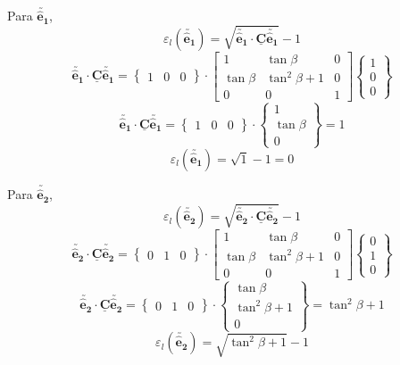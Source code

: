 \begin{enumerate}
		Para $\utilde{\mathbf{\hat{e}_1}}$,
		\[\varepsilon_l(\utilde{\mathbf{\hat{e}_1}})=\sqrt{\utilde{\mathbf{\hat{e}_1}}\cdot\underline{\mathbf{C}}\utilde{\mathbf{\hat{e}_1}}}-1\]
		\[
			\utilde{\mathbf{\hat{e}_1}}\cdot\underline{\mathbf{C}}\utilde{\mathbf{\hat{e}_1}}
			=
			\begin{Bmatrix}
				1 & 0 & 0
			\end{Bmatrix}
			\cdot
			\begin{bmatrix}
				1 & \tan\beta & 0 \\
				\tan\beta & \tan^2\beta + 1 & 0 \\
				0 & 0 & 1
			\end{bmatrix}
			\begin{Bmatrix}
				1 \\ 0 \\ 0
			\end{Bmatrix}
		\]
		\[
			\utilde{\mathbf{\hat{e}_1}}\cdot\underline{\mathbf{C}}\utilde{\mathbf{\hat{e}_1}}
			=
			\begin{Bmatrix}
				1 & 0 & 0
			\end{Bmatrix}
			\cdot
			\begin{Bmatrix}
				1 \\ \tan\beta \\ 0
			\end{Bmatrix}
			=
			1
		\]
		\[\varepsilon_l(\utilde{\mathbf{\hat{e}_1}})=\sqrt{1}-1=0\]
	
		Para $\utilde{\mathbf{\hat{e}_2}}$,
		\[\varepsilon_l(\utilde{\mathbf{\hat{e}_2}})=\sqrt{\utilde{\mathbf{\hat{e}_2}}\cdot\underline{\mathbf{C}}\utilde{\mathbf{\hat{e}_2}}}-1\]
		\[
			\utilde{\mathbf{\hat{e}_2}}\cdot\underline{\mathbf{C}}\utilde{\mathbf{\hat{e}_2}}
			=
			\begin{Bmatrix}
				0 & 1 & 0
			\end{Bmatrix}
			\cdot
			\begin{bmatrix}
				1 & \tan\beta & 0 \\
				\tan\beta & \tan^2\beta + 1 & 0 \\
				0 & 0 & 1
			\end{bmatrix}
			\begin{Bmatrix}
				0 \\ 1 \\ 0
			\end{Bmatrix}
		\]
		\[
			\utilde{\mathbf{\hat{e}_2}}\cdot\underline{\mathbf{C}}\utilde{\mathbf{\hat{e}_2}}
			=
			\begin{Bmatrix}
				0 & 1 & 0
			\end{Bmatrix}
			\cdot
			\begin{Bmatrix}
				\tan\beta \\ \tan^2\beta + 1 \\ 0
			\end{Bmatrix}
			=
			\tan^2\beta + 1
		\]
		\[\varepsilon_l(\utilde{\mathbf{\hat{e}_2}})=\sqrt{\tan^2\beta + 1}-1\]
	

\end{enumerate}
